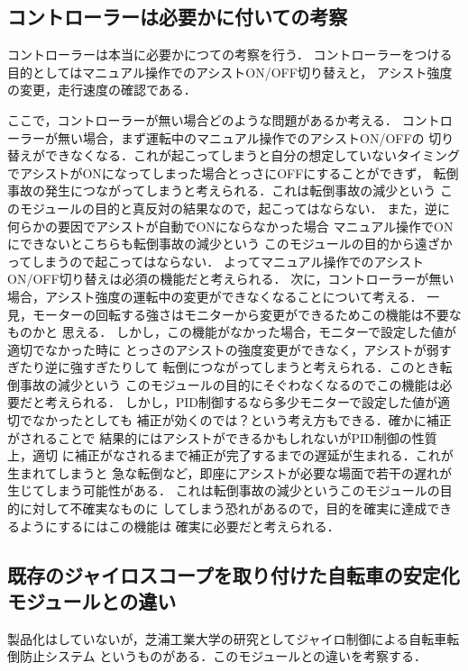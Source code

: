 \documentclass[uplatex,dvipdfmx]{jsarticle}
\begin{document}
\subsection{コントローラーは必要かに付いての考察}

コントローラーは本当に必要かにつての考察を行う．
コントローラーをつける目的としてはマニュアル操作でのアシストON/OFF切り替えと，
アシスト強度の変更，走行速度の確認である．

ここで，コントローラーが無い場合どのような問題があるか考える．
コントローラーが無い場合，まず運転中のマニュアル操作でのアシストON/OFFの
切り替えができなくなる．これが起こってしまうと自分の想定していないタイミング
でアシストがONになってしまった場合とっさにOFFにすることができず，
転倒事故の発生につながってしまうと考えられる．これは転倒事故の減少という
このモジュールの目的と真反対の結果なので，起こってはならない．
また，逆に何らかの要因でアシストが自動でONにならなかった場合
マニュアル操作でONにできないとこちらも転倒事故の減少という
このモジュールの目的から遠ざかってしまうので起こってはならない．
よってマニュアル操作でのアシストON/OFF切り替えは必須の機能だと考えられる．
次に，コントローラーが無い場合，アシスト強度の運転中の変更ができなくなることについて考える．
一見，モーターの回転する強さはモニターから変更ができるためこの機能は不要なものかと
思える．
しかし，この機能がなかった場合，モニターで設定した値が適切でなかった時に
とっさのアシストの強度変更ができなく，アシストが弱すぎたり逆に強すぎたりして
転倒につながってしまうと考えられる．このとき転倒事故の減少という
このモジュールの目的にそぐわなくなるのでこの機能は必要だと考えられる．
しかし，PID制御するなら多少モニターで設定した値が適切でなかったとしても
補正が効くのでは？という考え方もできる．確かに補正がされることで
結果的にはアシストができるかもしれないがPID制御の性質上，適切
に補正がなされるまで補正が完了するまでの遅延が生まれる．これが生まれてしまうと
急な転倒など，即座にアシストが必要な場面で若干の遅れが生じてしまう可能性がある．
これは転倒事故の減少というこのモジュールの目的に対して不確実なものに
してしまう恐れがあるので，目的を確実に達成できるようにするにはこの機能は
確実に必要だと考えられる．

\subsection{既存のジャイロスコープを取り付けた自転車の安定化モジュールとの違い}
製品化はしていないが，芝浦工業大学の研究としてジャイロ制御による自転車転倒防止システム
というものがある．このモジュールとの違いを考察する．
\end{document}
